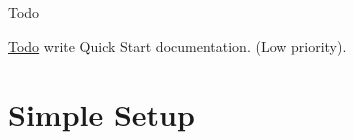 \begin{DoxyRefDesc}{Todo}
\item[\hyperlink{todo__todo000035}{Todo}]write Quick Start documentation. (Low priority).\end{DoxyRefDesc}


\section*{Simple Setup}